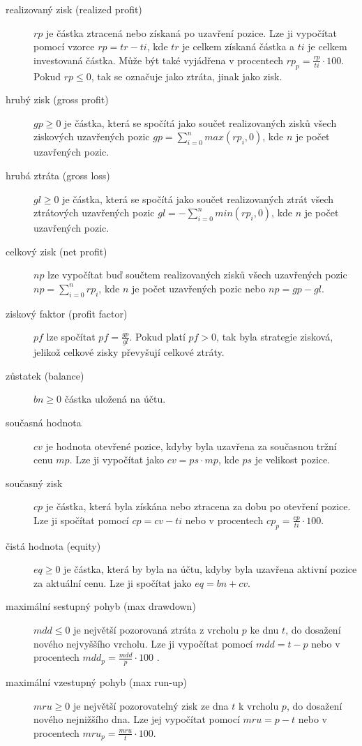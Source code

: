 \begin{description}
    \item [realizovaný zisk (realized profit)] $rp$ je částka ztracená nebo získaná po uzavření pozice.
    Lze ji vypočítat pomocí vzorce $rp=tr-ti$, kde $tr$ je celkem získaná částka a $ti$ je celkem investovaná částka.
    Může být také vyjádřena v procentech $rp_p=\frac{rp}{ti}\cdot 100$.
    Pokud $rp\leq0$, tak se označuje jako ztráta, jinak jako zisk.
    \item[hrubý zisk (gross profit)] $gp\geq0$ je částka, která se spočítá jako součet realizovaných zisků všech ziskových uzavřených pozic $gp=\sum_{i=0}^{n} max(rp_i, 0)$, kde $n$ je počet uzavřených pozic.
    \item[hrubá ztráta (gross loss)] $gl\geq0$ je částka, která se spočítá jako součet realizovaných ztrát všech ztrátových uzavřených pozic $gl=-\sum_{i=0}^{n} min(rp_i, 0)$, kde $n$ je počet uzavřených pozic.
    \item[celkový zisk (net profit)] $np$ lze vypočítat buď součtem realizovaných zisků všech uzavřených pozic $np=\sum_{i=0}^{n} rp_i$, kde $n$ je počet uzavřených pozic nebo $np=gp-gl$.
    \item [ziskový faktor (profit factor)] $pf$ lze spočítat $pf=\frac{gp}{gl}$.
    Pokud platí $pf>0$, tak byla strategie zisková, jelikož celkové zisky převyšují celkové ztráty.
    \item[zůstatek (balance)] $bn\geq0$ částka uložená na účtu.
    \item[současná hodnota] $cv$ je hodnota otevřené pozice, kdyby byla uzavřena za současnou tržní cenu $mp$.
    Lze ji vypočítat jako $cv=ps\cdot mp$, kde $ps$ je velikost pozice.
    \item[současný zisk] $cp$ je částka, která byla získána nebo ztracena za dobu po otevření pozice.
    Lze ji spočítat pomocí $cp=cv-ti$ nebo v procentech $cp_p = \frac{cp}{ti}\cdot 100$.
    \item[čistá hodnota (equity)] $eq\geq0$ je částka, která by byla na účtu, kdyby byla uzavřena aktivní pozice za aktuální cenu.
    Lze ji spočítat jako $eq=bn+cv$.
    \item[maximální sestupný pohyb (max drawdown)] $mdd\leq0$ je největší pozorovaná ztráta z vrcholu $p$ ke dnu $t$, do dosažení nového nejvyššího vrcholu.
    Lze ji vypočítat pomocí $mdd=t-p$ nebo v procentech $mdd_p=\frac{mdd}{p}\cdot 100$ \cite{max-drawdown}.
    \item[maximální vzestupný pohyb (max run-up)] $mru\geq0$ je největší pozorovatelný zisk ze dna $t$ k vrcholu $p$, do dosažení nového nejnižšího dna.
    Lze jej vypočítat pomocí $mru=p-t$ nebo v procentech $mru_p=\frac{mru}{t}\cdot 100$.
\end{description}

